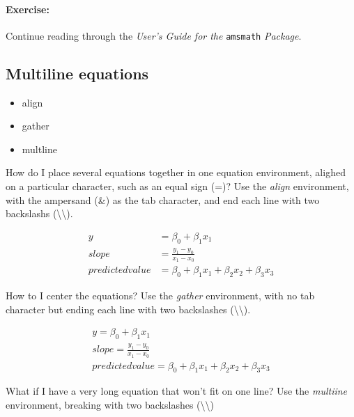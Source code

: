 		\paragraph{Exercise:}Continue reading through the \textit{User's Guide for the }\texttt{amsmath} \textit{Package}.

        \subsection{Multiline equations}
        \label{Multiline equations}
        
        \begin{framed}
            \begin{itemize}
                \item{align}
                \item{gather}
                \item{multline}
            \end{itemize}
        \end{framed}

		How do I place several equations together in one equation environment, alighed on a particular character, such as an equal sign (=)? Use the \textit{align} environment, with the ampersand (\&) as the tab character, and end each line with two backslashs (\textbackslash{}\textbackslash{}).

		\begin{align}
			y& = \beta_0 + \beta_1 x_1\\
			slope& = \frac{y_1 - y_0}{x_1 - x_0}\\
			predictedvalue& = \beta_0 + \beta_1 x_1 + \beta_2 x_2 + \beta_3 x_3
		\end{align}

		How to I center the equations? Use the \textit{gather} environment, with no tab character but ending each line with two backslashes (\textbackslash{}\textbackslash{}).

		\begin{gather}
			y = \beta_0 + \beta_1 x_1\\
			slope = \frac{y_1 - y_0}{x_1 - x_0}\\
			predictedvalue = \beta_0 + \beta_1 x_1 + \beta_2 x_2 + \beta_3 x_3
		\end{gather}

		What if I have a very long equation that won't fit on one line? Use the \textit{multiine} environment, breaking with two backslashes (\textbackslash{}\textbackslash{})


